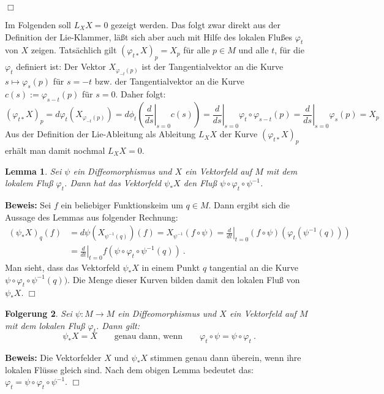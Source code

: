 \documentclass[12pt,a4paper]{article}
\newtheorem{Lemma}{Lemma}[section]
\newtheorem{Folgerung}[Lemma]{Folgerung}
\def\proof{\noindent\textbf{Beweis:}\quad}
\def\qed{\quad\hfill\ensuremath{\Box}}
\begin{document}
\qed

\bigskip

Im Folgenden soll $L_XX=0$ gezeigt werden. Das folgt zwar direkt aus der Definition der Lie-Klammer,
l\"a\ss t sich aber auch mit Hilfe des lokalen Flu\ss es $\varphi_t$ von $X$ zeigen.  Tats\"achlich
gilt $(\varphi_{t*}X)_p=X_p$ f\"ur alle $p\in M$ und alle $t$, f\"ur die $\varphi_t$ definiert ist:
Der Vektor $X_{\varphi_{-t}(p)}$ ist der Tangentialvektor an die Kurve $s\mapsto \varphi_s(p)$
f\"ur $s=-t$ bzw. der Tangentialvektor an die Kurve $c(s):=\varphi_{s-t}(p)$ f\"ur $s=0$.
Daher folgt:
$$
(\varphi_{t*}X)_p=d\varphi_t(X_{\varphi_{-t}(p)}) = d\phi_t \left(\left.\frac{d}{ds}\right|_{s=0} c(s) \right)
=\left.\frac{d}{ds}\right|_{s=0} \varphi_t\circ\varphi_{s-t}(p)
=\left.\frac{d}{ds}\right|_{s=0}\varphi_s(p) = X_p
$$
Aus der Definition der Lie-Ableitung als Ableitung $L_XX$ der Kurve $(\varphi_{t*}X)_p$ erh\"alt man
damit nochmal $L_XX=0$.

\bigskip

\begin{Lemma}
Sei $\psi$ ein Diffeomorphismus und $X$ ein Vektorfeld auf $M$ mit dem lokalem Flu\ss{}
$\varphi_t$. Dann hat das Vektorfeld $\psi_*X$ den Flu\ss{} $\psi\circ \varphi_t \circ \psi^{-1}$.
\end{Lemma}
\proof
Sei $f$ ein beliebiger Funktionskeim um $q\in M$. Dann ergibt sich die Aussage des Lemmas
aus folgender Rechnung:
$$
\begin{array}{rl}
(\psi_* X)_q(f) &= d\psi (X_{\psi^{-1}(q)})(f)
=
X_{\psi^{-1}} (f\circ \psi)
=
\left.\frac{d}{dt}\right|_{t=0} (f\circ \psi)(\varphi_t(\psi^{-1}(q)))\\[1ex]
& =
\left.\frac{d}{dt}\right|_{t=0} f(\psi \circ \varphi_t \circ \psi^{-1}(q)) \ .
\end{array}
$$
Man sieht, dass das Vektorfeld $\psi_* X$ in einem Punkt $q$ tangential an die
Kurve $\psi \circ \varphi_t \circ \psi^{-1}(q))$. Die Menge dieser Kurven bilden
damit den lokalen Flu\ss{} von $\psi_* X$.
\qed

\bigskip

\begin{Folgerung}\label{folgerung}
Sei $\psi : M \rightarrow M$ ein Diffeomorphismus und $X$ ein Vektorfeld auf $M$ mit
dem lokalen Flu\ss{} $\varphi_t$. Dann gilt:
$$
\psi_* X = X \qquad \mbox{genau dann, wenn} \qquad
\varphi_t \circ \psi = \psi \circ \varphi_t \ .
$$
\end{Folgerung}
\proof
Die Vektorfelder $X$ und $\psi_*X$ stimmen genau dann \"uberein, wenn ihre lokalen
Fl\"usse gleich sind. Nach dem  obigen Lemma bedeutet das:
$\varphi_t = \psi \circ \varphi_t \circ \psi^{-1}$.
\qed
\end{document}
